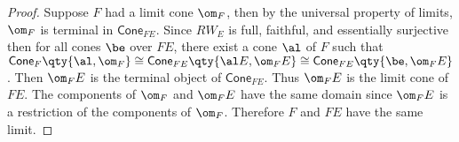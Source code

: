 \documentclass[../../main]{subfiles}
\begin{document}
\begin{proof}
	Suppose $F$ had a limit cone $\om_{F}$, then by the universal property
	of limits, $\om_{F}$ is terminal in $\mathsf{Cone}_{FE}$. Since $RW_{E}$
	is full, faithful, and essentially surjective then for all cones $\be$
	over $FE$, there exist a cone $\al$ of $F$ such that
	$\mathsf{Cone}_{F}\qty{\al,\om_{F}} \cong \mathsf{Cone}_{FE}\qty{\al E,
	\om_{F} E}  \cong \mathsf{Cone}_{FE}\qty{\be,\om_{F}E}$. Then
	$\om_{F}E$ is the terminal object of $\mathsf{Cone}_{FE}$. Thus $\om_{F}E$
	is the limit cone of $FE$. The components of $\om_{F}$ and $\om_{F}E$ have
	the same domain since $\om_{F}E$ is a restriction of the components of
	$\om_{F}$. Therefore $F$ and $FE$ have the same limit.

\end{proof}
\end{document}
